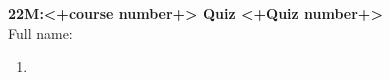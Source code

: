 \documentclass{article}
\begin{document}
\vspace{-10cm}
\begin{center}
   \textbf{22M:<+course number+> Quiz <+Quiz number+>\\}
   \vspace{1cm}
   Full name: \makebox[2in]{\hrulefill}\hspace{.5in}\\ \vspace{1cm}
\end{center}


\begin{enumerate}
   \item<++>
\end{enumerate}
\end{document}
